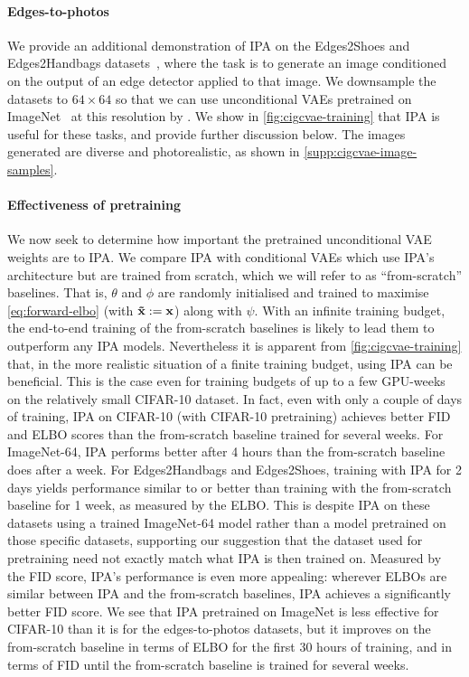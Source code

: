 \paragraph{Edges-to-photos}
We provide an additional demonstration of IPA on the Edges2Shoes and
Edges2Handbags datasets~\citep{isola2016image}, where the task is to generate an
image conditioned on the output of an edge detector applied to that image. We
downsample the datasets to $64\times64$ so that we can use unconditional VAEs
pretrained on ImageNet~\citep{deng2009imagenet} at this resolution by
\citet{child2020very}. We show in \cref{fig:cigcvae-training} that IPA is useful for
these tasks, and provide further discussion below. The images generated are
diverse and photorealistic, as shown in \cref{supp:cigcvae-image-samples}.

\paragraph{Effectiveness of pretraining}
We now seek to determine how important the pretrained unconditional VAE weights
are to IPA. We compare IPA with conditional VAEs which use IPA's architecture
but are trained from scratch, which we will refer to as ``from-scratch''
baselines. That is, $\theta$ and $\phi$ are randomly initialised and trained to
maximise \cref{eq:forward-elbo} (with $\mathbf{\tilde{x}}{} := {\mathbf{x}}$) along with
$\psi$.
%
With an infinite training budget, the end-to-end training of the from-scratch
baselines is likely to lead them to outperform any IPA models. Nevertheless it
is apparent from \cref{fig:cigcvae-training} that, in the more realistic situation of a
finite training budget, using IPA can be beneficial. This is the case even for
training budgets of up to a few GPU-weeks on the relatively small CIFAR-10
dataset. In fact, even with only a couple of days of training, IPA on CIFAR-10
(with CIFAR-10 pretraining) achieves better FID and ELBO scores than the
from-scratch baseline trained for several weeks. For ImageNet-64, IPA performs
better after 4 hours than the from-scratch baseline does after a week.
%
For Edges2Handbags and Edges2Shoes, training with IPA for 2 days yields
performance similar to or better than training with the from-scratch baseline
for 1 week, as measured by the ELBO. This is despite IPA on these datasets using
a trained ImageNet-64 model rather than a model pretrained on those specific
datasets, supporting our suggestion that the dataset used for pretraining need
not exactly match what IPA is then trained on.
%
Measured by the FID score, IPA's performance is even more appealing: wherever
ELBOs are similar between IPA and the from-scratch baselines, IPA achieves a
significantly better FID score.
%
We see that IPA pretrained on ImageNet is less effective for CIFAR-10
than it is for the edges-to-photos datasets, but it improves on the from-scratch
baseline in terms of ELBO for the first 30 hours of training, and in terms of
FID until the from-scratch baseline is trained for several weeks.

